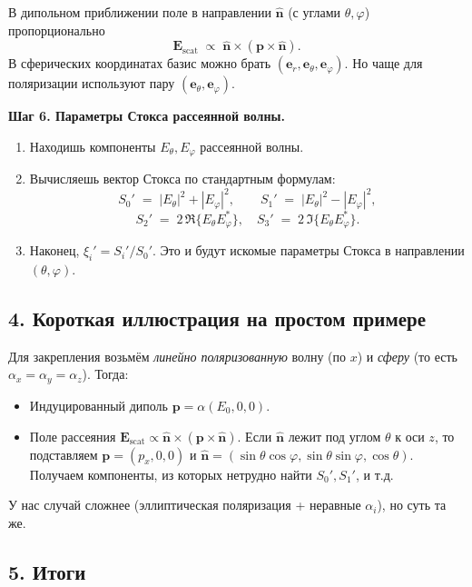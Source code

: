 \documentclass{article}
\begin{document}
В дипольном приближении поле в направлении $\mathbf{\hat{n}}$ (с углами $\theta,\varphi$) пропорционально
\[
  \mathbf{E}_\text{scat} \;\propto\;
  \mathbf{\hat{n}} \times (\mathbf{p} \times \mathbf{\hat{n}}).
\]
В сферических координатах базис можно брать $(\mathbf{e}_r,\mathbf{e}_\theta,\mathbf{e}_\varphi)$. Но чаще для поляризации используют пару $(\mathbf{e}_\theta,\mathbf{e}_\varphi)$.

\textbf{Шаг 6. Параметры Стокса рассеянной волны.}

\begin{enumerate}
  \item Находишь компоненты $E_{\theta}, E_{\varphi}$ рассеянной волны.
  \item Вычисляешь вектор Стокса по стандартным формулам:
  \[
    S_0' \;=\; |E_{\theta}|^2 + |E_{\varphi}|^2,
    \qquad
    S_1' \;=\; |E_{\theta}|^2 - |E_{\varphi}|^2,
  \]
  \[
    S_2' \;=\; 2\,\Re\{E_{\theta}E_{\varphi}^*\},
    \quad
    S_3' \;=\; 2\,\Im\{E_{\theta}E_{\varphi}^*\}.
  \]
  \item Наконец, $\xi_i' = S_i'/S_0'$. Это и будут искомые параметры Стокса в направлении $(\theta,\varphi)$.
\end{enumerate}

\subsection*{4. Короткая иллюстрация на простом примере}

Для закрепления возьмём \emph{линейно поляризованную} волну (по $x$) и \emph{сферу} (то есть $\alpha_x=\alpha_y=\alpha_z$). Тогда:

\begin{itemize}
  \item Индуцированный диполь $\mathbf{p} = \alpha (E_{0}, 0, 0)$.
  \item Поле рассеяния $\mathbf{E}_\text{scat} \propto \mathbf{\hat{n}}\times(\mathbf{p}\times\mathbf{\hat{n}})$. Если $\mathbf{\hat{n}}$ лежит под углом $\theta$ к оси $z$, то подставляем $\mathbf{p}=(p_x,0,0)$ и $\mathbf{\hat{n}}=(\sin\theta\cos\varphi,\sin\theta\sin\varphi,\cos\theta)$. Получаем компоненты, из которых нетрудно найти $S_0', S_1'$, и т.д.
\end{itemize}

У нас случай сложнее (эллиптическая поляризация + неравные $\alpha_i$), но суть та же.

\subsection*{5. Итоги}
\end{document}
